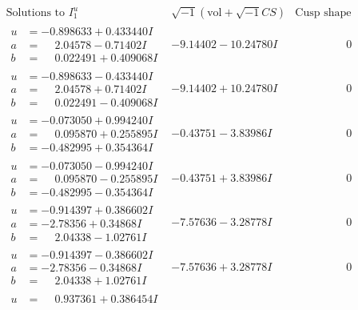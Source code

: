 \documentclass[1p]{elsarticle_modified}
\theoremstyle{definition}
\newcommand{\I}{\sqrt{-1}}
\begin{document}
$$\begin{array}{c|c|c}  
\text{Solutions to }I^u_{1}& \I (\text{vol} + \sqrt{-1}CS) & \text{Cusp shape}\\
 \hline 
\begin{aligned}
u &= -0.898633 + 0.433440 I \\
a &= \phantom{-}2.04578 - 0.71402 I \\
b &= \phantom{-}0.022491 + 0.409068 I\end{aligned}
 & -9.14402 - 10.24780 I & \phantom{-0.000000 } 0 \\ \hline\begin{aligned}
u &= -0.898633 - 0.433440 I \\
a &= \phantom{-}2.04578 + 0.71402 I \\
b &= \phantom{-}0.022491 - 0.409068 I\end{aligned}
 & -9.14402 + 10.24780 I & \phantom{-0.000000 } 0 \\ \hline\begin{aligned}
u &= -0.073050 + 0.994240 I \\
a &= \phantom{-}0.095870 + 0.255895 I \\
b &= -0.482995 + 0.354364 I\end{aligned}
 & -0.43751 - 3.83986 I & \phantom{-0.000000 } 0 \\ \hline\begin{aligned}
u &= -0.073050 - 0.994240 I \\
a &= \phantom{-}0.095870 - 0.255895 I \\
b &= -0.482995 - 0.354364 I\end{aligned}
 & -0.43751 + 3.83986 I & \phantom{-0.000000 } 0 \\ \hline\begin{aligned}
u &= -0.914397 + 0.386602 I \\
a &= -2.78356 + 0.34868 I \\
b &= \phantom{-}2.04338 - 1.02761 I\end{aligned}
 & -7.57636 - 3.28778 I & \phantom{-0.000000 } 0 \\ \hline\begin{aligned}
u &= -0.914397 - 0.386602 I \\
a &= -2.78356 - 0.34868 I \\
b &= \phantom{-}2.04338 + 1.02761 I\end{aligned}
 & -7.57636 + 3.28778 I & \phantom{-0.000000 } 0 \\ \hline\begin{aligned}
u &= \phantom{-}0.937361 + 0.386454 I \\

\end{aligned}
\end{array}$$
\end{document}
